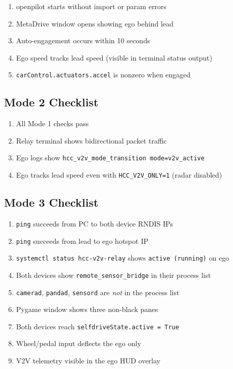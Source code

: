 \documentclass[11pt, letterpaper]{article}
\begin{document}
\begin{enumerate}
  \item[\(\square\)] openpilot starts without import or param errors
  \item[\(\square\)] MetaDrive window opens showing ego behind lead
  \item[\(\square\)] Auto-engagement occurs within 10 seconds
  \item[\(\square\)] Ego speed tracks lead speed (visible in terminal
        status output)
  \item[\(\square\)] \texttt{carControl.actuators.accel} is nonzero when
        engaged
\end{enumerate}

\subsection{Mode 2 Checklist}

\begin{enumerate}
  \item[\(\square\)] All Mode 1 checks pass
  \item[\(\square\)] Relay terminal shows bidirectional packet traffic
  \item[\(\square\)] Ego logs show \texttt{hcc\_v2v\_mode\_transition
        mode=v2v\_active}
  \item[\(\square\)] Ego tracks lead speed even with
        \texttt{HCC\_V2V\_ONLY=1} (radar disabled)
\end{enumerate}

\subsection{Mode 3 Checklist}

\begin{enumerate}
  \item[\(\square\)] \texttt{ping} succeeds from PC to both device RNDIS
        IPs
  \item[\(\square\)] \texttt{ping} succeeds from lead to ego hotspot IP
  \item[\(\square\)] \texttt{systemctl status hcc-v2v-relay} shows
        \texttt{active (running)} on ego
  \item[\(\square\)] Both devices show \texttt{remote\_sensor\_bridge} in
        their process list
  \item[\(\square\)] \texttt{camerad}, \texttt{pandad}, \texttt{sensord}
        are \emph{not} in the process list
  \item[\(\square\)] Pygame window shows three non-black panes
  \item[\(\square\)] Both devices reach
        \texttt{selfdriveState.active = True}
  \item[\(\square\)] Wheel/pedal input deflects the ego only
  \item[\(\square\)] V2V telemetry visible in the ego HUD overlay
\end{enumerate}
\end{document}
